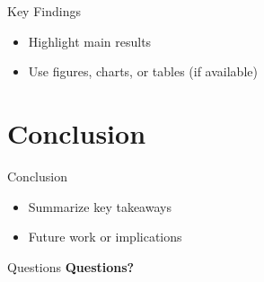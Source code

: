 \documentclass{beamer}
\begin{document}
\begin{frame}{Key Findings}
    \begin{itemize}
        \item Highlight main results
        \item Use figures, charts, or tables (if available)
    \end{itemize}
\end{frame}

\section{Conclusion}

\begin{frame}{Conclusion}
    \begin{itemize}
        \item Summarize key takeaways
        \item Future work or implications
    \end{itemize}
\end{frame}

\begin{frame}{Questions}
    \centering
    {\Huge \textbf{Questions?}}
\end{frame}
\end{document}

